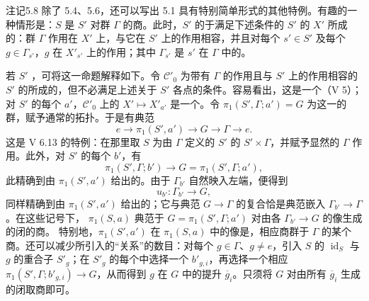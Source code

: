 \begin{SGAresult}{注记}{5.8}
除了 5.4、5.6，还可以写出 5.1 具有特别简单形式的其他特例。有趣的一种情形是：$S$ 是 $S'$ 对群 $\Gamma$ 的商。此时，$S'$ 的于满足下述条件的 $S'$ 的 $X'$ 所成的：群 $\Gamma$ 作用在 $X'$ 上，与它在 $S'$ 上的作用相容，并且对每个 $s'\in S'$ 及每个 $g\in\Gamma_{s'}$，$g$ 在 $X'_{s'}$ 上的作用；其中 $\Gamma_{s'}$ 是 $s'$ 在 $\Gamma$ 中的。

若 $S'$ ，可将这一命题解释如下。令 $\mathcal C'_0$ 为带有 $\Gamma$ 的作用且与 $S'$ 上的作用相容的 $S'$ 的所成的，但不必满足上述关于 $S'$ 各点的条件。容易看出，这是一个（V 5）；对 $S'$ 的每个 $a'$，$\mathcal C'_0$ 上的 $X'\mapsto X'_{a'}$ 是一个。令 $\pi_1(S',\Gamma;a')=G$ 为这一的群，赋予通常的拓扑。于是有典范
\[
e\longrightarrow\pi_1(S',a')\longrightarrow G\longrightarrow\Gamma\longrightarrow e.
\]
这是 V 6.13 的特例：在那里取 $S$ 为由 $\Gamma$ 定义的 $S'$ 的 $S'\times\Gamma$，并赋予显然的 $\Gamma$ 作用。此外，对 $S'$ 的每个 $b'$，有
\[
\pi_1(S',\Gamma;b')\longrightarrow G=\pi_1(S',\Gamma;a'),
\]
此精确到由 $\pi_1(S',a')$ 给出的。由于 $\Gamma_{b'}$ 自然映入左端，便得到
\[
u_{b'}:\Gamma_{b'}\longrightarrow G,
\]
同样精确到由 $\pi_1(S',a')$ 给出的；它与典范 $G\to\Gamma$ 的复合恰是典范嵌入 $\Gamma_{b'}\to\Gamma$。在这些记号下， $\pi_1(S,a)$ 典范于 $G=\pi_1(S',\Gamma;a')$ 对由各 $\Gamma_{b'}\to G$ 的像生成的闭的商。
特别地，$\pi_1(S',a')$ 在 $\pi_1(S,a)$ 中的像是，相应商群于 $\Gamma$ 的某个商。还可以减少所引入的“关系”的数目：对每个 $g\in\Gamma$、$g\ne e$，引入 $S$ 的 $\operatorname{id}_S$ 与 $g$ 的重合子 $S'_g$；在 $S'_g$ 的每个中选择一个 $b'_{g,i}$，再选择一个相应 $\pi_1(S',\Gamma;b'_{g,i})\to G$，从而得到 $g$ 在 $G$ 中的提升 $\overline g_i$。只须将 $G$ 对由所有 $\overline g_i$ 生成的闭取商即可。


\end{SGAresult}
